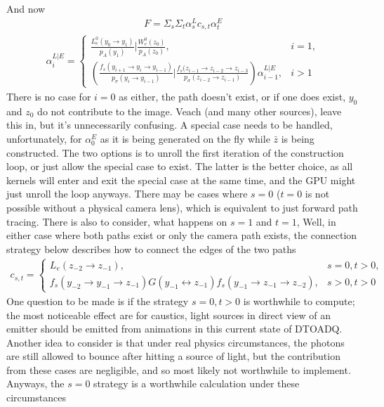 \documentclass{article}
\begin{document}
    And now
  \begin{align}
    F = \Sigma_s\Sigma_t \alpha^L_s c_{s, t} \alpha^E_t
  \end{align}
  \begin{align}
    \alpha^{L|E}_i =
    \begin{cases}
      \frac{L_e^0(y_0 \rightarrow y_1)}{p_A(y_1)} | \frac{W^0_e(z_0)}{p_A(z_0)},
      &i = 1,\\
      (\frac{f_s(y_{i+1} \rightarrow y_i \rightarrow y_{i-1})}{p_{\sigma}(y_i
      \rightarrow y_{i-1})} | \frac{f_s(z_{i-1} \rightarrow z_{i-2} \rightarrow
      z_{i-3}}{p_\sigma(z_{i-2} \rightarrow z_{i-1})}) \alpha^{L|E}_{i-1},
      &i > 1
    \end{cases}
  \end{align}
    There is no case for $i = 0$ as either, the path doesn't exist, or if one
    does exist, $y_0$ and $z_0$ do not contribute to the image. Veach (and many other
    sources), leave this in, but it's unnecessarily confusing. A special case
    needs to be handled, unfortunately, for $\alpha^E_0$ as it is being
    generated on the fly while $\bar{z}$ is being constructed. The two options
    is to unroll the first iteration of the construction loop, or just allow the
    special case to exist. The latter is the better choice, as all kernels will
    enter and exit the special case at the same time, and the GPU might just
    unroll the loop anyways.
    There may be cases where $s = 0$ ($t = 0$ is not possible without a
    physical camera lens), which is equivalent to just forward path tracing.
    There is also to consider, what happens on $s = 1$ and $t = 1$, %
    Well, in either case where both paths exist or only the camera path exists,
    the connection strategy below describes how to connect the edges of the two
    paths
  \begin{align}
    c_{s, t} =
    \begin{cases}
      L_e(z_{-2} \rightarrow z_{-1}), &s = 0, t > 0,\\
      f_s(y_{-2} \rightarrow y_{-1} \rightarrow z_{-1}) G(y_{-1} \leftrightarrow
      z_{-1}) f_s(y_{-1} \rightarrow z_{-1} \rightarrow z_{-2}), &s > 0, t > 0
    \end{cases}
  \end{align}
    One question to be made is if the strategy $s = 0, t > 0$ is worthwhile to
    compute; the most noticeable effect are for caustics, light sources in
    direct view of an emitter should be emitted from animations in this current
    state of DTOADQ. Another idea to consider is that under real physics
    circumstances, the photons are still allowed to bounce after hitting a
    source of light, but the contribution from these cases are negligible, and
    so most likely not worthwhile to implement. Anyways, the $s = 0$
    strategy is a worthwhile  calculation under these circumstances
\end{document}
